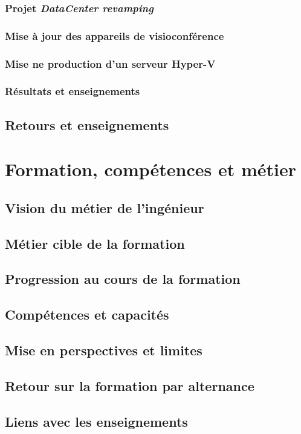 \documentclass[a4paper,12pt]{report}
\begin{document}
\subsection{Projet \textit{DataCenter revamping}}
\subsection{Mise à jour des appareils de visioconférence}
\subsection{Mise ne production d'un serveur Hyper-V}
\subsection{Résultats et enseignements}
\section{Retours et enseignements}

\chapter{Formation, compétences et métier}
\section{Vision du métier de l'ingénieur}
\section{Métier cible de la formation}
\section{Progression au cours de la formation}
\section{Compétences et capacités}
\section{Mise en perspectives et limites}
\section{Retour sur la formation par alternance}
\section{Liens avec les enseignements}
\end{document}
